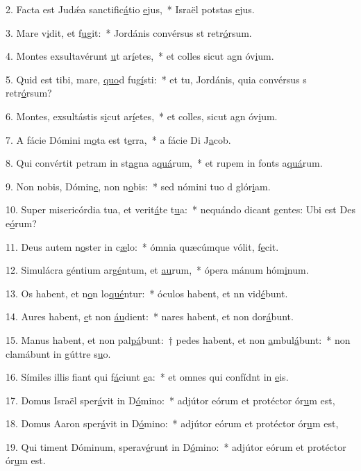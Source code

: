 2. Facta est Judǽa sanctific\uline{á}tio \uline{e}jus,~* Israël potstas \uline{e}jus.\par 
3. Mare v\uline{i}dit, et f\uline{u}git:~* Jordánis convérsus st retr\uline{ó}rsum.\par 
4. Montes exsultavérunt \uline{u}t ar\uline{í}etes,~* et colles sicut agn óv\uline{i}um.\par 
5. Quid est tibi, mare, \uline{quo}d fug\uline{í}sti:~* et tu, Jordánis, quia convérsus s retr\uline{ó}rsum?\par 
6. Montes, exsultástis s\uline{i}cut ar\uline{í}etes,~* et colles, sicut agn óv\uline{i}um.\par 
7. A fácie Dómini m\uline{o}ta est t\uline{e}rra,~* a fácie Di J\uline{a}cob.\par 
8. Qui convértit petram in st\uline{a}gna a\uline{quá}rum,~* et rupem in fonts a\uline{quá}rum.\par 
9. Non nobis, Dómin\uline{e}, non n\uline{o}bis:~* sed nómini tuo d glór\uline{i}am.\par 
10. Super misericórdia tua, et verit\uline{á}te t\uline{u}a:~* nequándo dicant gentes: Ubi est Des e\uline{ó}rum?\par 
11. Deus autem n\uline{o}ster in c\uline{æ}lo:~* ómnia quæcúmque vólit, f\uline{e}cit.\par 
12. Simulácra géntium arg\uline{é}ntum, et \uline{au}rum,~* ópera mánum hóm\uline{i}num.\par 
13. Os habent, et n\uline{o}n lo\uline{qué}ntur:~* óculos habent, et nn vid\uline{é}bunt.\par 
14. Aures habent, \uline{e}t non \uline{áu}dient:~* nares habent, et non dor\uline{á}bunt.\par 
15. Manus habent, et non pal\uline{pá}bunt:~† pedes habent, et non \uline{a}mbul\uline{á}bunt:~* non clamábunt in gúttre s\uline{u}o.\par 
16. Símiles illis fiant qui f\uline{á}ciunt \uline{e}a:~* et omnes qui confídnt in \uline{e}is.\par 
17. Domus Israël sper\uline{á}vit in D\uline{ó}mino:~* adjútor eórum et protéctor ór\uline{u}m est,\par 
18. Domus Aaron sper\uline{á}vit in D\uline{ó}mino:~* adjútor eórum et protéctor ór\uline{u}m est,\par 
19. Qui timent Dóminum, sperav\uline{é}runt in D\uline{ó}mino:~* adjútor eórum et protéctor ór\uline{u}m est.\par 
